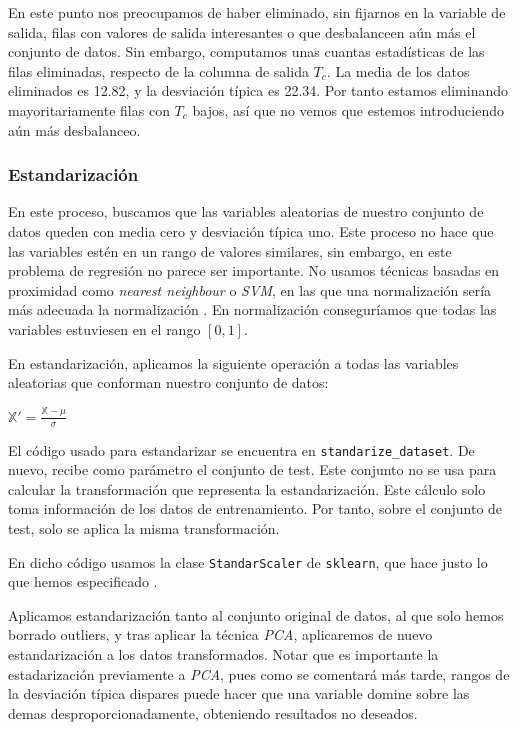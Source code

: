 \documentclass[11pt]{article}
\begin{document}
En este punto nos preocupamos de haber eliminado, sin fijarnos en la variable de salida, filas con valores de salida interesantes o que desbalanceen aún más el conjunto de datos. Sin embargo, computamos unas cuantas estadísticas de las filas eliminadas, respecto de la columna de salida $T_c$. La media de los datos eliminados es 12.82, y la desviación típica es 22.34. Por tanto estamos eliminando mayoritariamente filas con $T_c$ bajos, así que no vemos que estemos introduciendo aún más desbalanceo.

\subsubsection{Estandarización}

En este proceso, buscamos que las variables aleatorias de nuestro conjunto de datos queden con media cero y desviación típica uno. Este proceso no hace que las variables estén en un rango de valores similares, sin embargo, en este problema de regresión no parece ser importante. No usamos técnicas basadas en proximidad como \emph{nearest neighbour} o \emph{SVM}, en las que una normalización sería más adecuada la normalización \cite{normalization_vs_standarization:online}. En normalización conseguríamos que todas las variables estuviesen en el rango $[0, 1]$.

En estandarización, aplicamos la siguiente operación a todas las variables aleatorias que conforman nuestro conjunto de datos:

$\mathbb{X'} = \frac{\mathbb{X} - \mu}{\sigma}$

El código usado para estandarizar se encuentra en \lstinline{standarize_dataset}. De nuevo, recibe como parámetro el conjunto de test. Este conjunto no se usa para calcular la transformación que representa la estandarización. Este cálculo solo toma información de los datos de entrenamiento. Por tanto, sobre el conjunto de test, solo se aplica la misma transformación.

En dicho código usamos la clase \lstinline{StandarScaler} de \lstinline{sklearn}, que hace justo lo que hemos especificado \cite{sklearn_std_scaler:online}.

Aplicamos estandarización tanto al conjunto original de datos, al que solo hemos borrado outliers, y tras aplicar la técnica \emph{PCA}, aplicaremos de nuevo estandarización a los datos transformados. Notar que es importante la estadarización previamente a \emph{PCA}, pues como se comentará más tarde, rangos de la desviación típica dispares puede hacer que una variable domine sobre las demas desproporcionadamente, obteniendo resultados no deseados.
\end{document}
